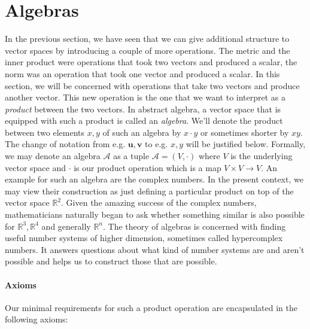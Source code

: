 \section{Algebras}
In the previous section, we have seen that we can give additional structure to vector spaces by introducing a couple of more operations. The metric and the inner product were operations that took two vectors and produced a scalar, the norm was an operation that took one vector and produced a scalar. In this section, we will be concerned with operations that take two vectors and produce another vector. This new operation is the one that we want to interpret as a \emph{product} between the two vectors.  In abstract algebra, a vector space that is equipped with such a product is called an \emph{algebra}. We'll denote the product between two elements $x,y$ of such an algebra by $x \cdot y$ or sometimes shorter by $x y$. The change of notation from e.g. $\mathbf{u,v}$ to e.g. $x,y$ will be justified below. Formally, we may denote an algebra $\mathcal{A}$ as a tuple $\mathcal{A} = (V, \cdot)$ where $V$ is the underlying vector space and $\cdot$ is our product operation which is a map $V \times V \rightarrow V$. An example for such an algebra are the complex numbers. In the present context, we may view their construction as just defining a particular product on top of the vector space $\mathbb{R}^2$. Given the amazing success of the complex numbers, mathematicians naturally began to ask whether something similar is also possible for $\mathbb{R}^3, \mathbb{R}^4$ and generally $\mathbb{R}^n$. The theory of algebras is concerned with finding useful number systems of higher dimension, sometimes called hypercomplex numbers. It answers questions about what kind of number systems are and aren't possible and helps us to construct those that are possible.




\paragraph{Axioms} 
Our minimal requirements for such a product operation are encapsulated in the following axioms:


